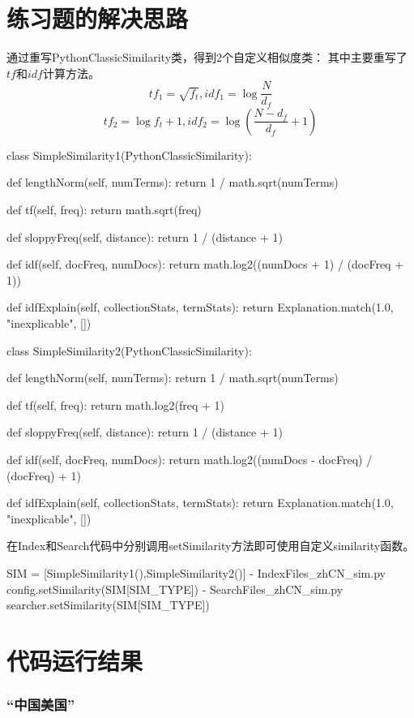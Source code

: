 \documentclass[12pt,a4paper]{article}
\begin{document}
\section{练习题的解决思路}
通过重写PythonClassicSimilarity类，得到2个自定义相似度类：
其中主要重写了$tf$和$idf$计算方法。
$$tf_1=\sqrt{f_t}, idf_1=\log{\frac{N}{d_f}}$$
$$tf_2=\log{f_t+1}, idf_2=\log{(\frac{N-d_f}{d_f}+1)}$$
\begin{python}
class SimpleSimilarity1(PythonClassicSimilarity):

    def lengthNorm(self, numTerms):
        return 1 / math.sqrt(numTerms)

    def tf(self, freq):
        return math.sqrt(freq)

    def sloppyFreq(self, distance):
        return 1 / (distance + 1)

    def idf(self, docFreq, numDocs):
        return math.log2((numDocs + 1) / (docFreq + 1))

    def idfExplain(self, collectionStats, termStats):
        return Explanation.match(1.0, "inexplicable", [])

class SimpleSimilarity2(PythonClassicSimilarity):

    def lengthNorm(self, numTerms):
        return 1 / math.sqrt(numTerms)

    def tf(self, freq):
        return math.log2(freq + 1)

    def sloppyFreq(self, distance):
        return 1 / (distance + 1)

    def idf(self, docFreq, numDocs):
        return math.log2((numDocs - docFreq) / (docFreq) + 1)

    def idfExplain(self, collectionStats, termStats):
        return Explanation.match(1.0, "inexplicable", [])
\end{python}
在Index和Search代码中分别调用setSimilarity方法即可使用自定义similarity函数。
\begin{python}
SIM = [SimpleSimilarity1(),SimpleSimilarity2()]
- IndexFiles_zhCN_sim.py
config.setSimilarity(SIM[SIM_TYPE])
- SearchFiles_zhCN_sim.py
searcher.setSimilarity(SIM[SIM_TYPE])
\end{python}
\section{代码运行结果}

\subsubsection{“中国美国”}
\end{document}
